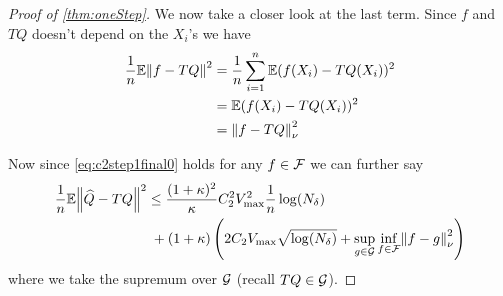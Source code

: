 \begin{proof}[Proof of \cref{thm:oneStep}]
  We now take a closer look at the last term. Since $f$ and $TQ$ doesn't
  depend on the $X_i$'s we have
  \begin{align*}
    \frac{1}{n} \mathbb{E} \norm{f- TQ}^2
    = & \; \frac{1}{n} \sum_{i=1}^n \mathbb{E} (f(X_i) - TQ(X_i))^2
    \\ = & \; \mathbb{E} (f(X_i) - TQ(X_i))^2
    \\ = & \; \norm{f - TQ}^2_\nu
  \end{align*}

  Now since \cref{eq:c2step1final0} holds
  for any $f \in \mathcal{F}$ we can further say
  \begin{align}
    \frac{1}{n} \mathbb{E} \norm{\widehat{Q} - TQ}^2
    & \leq \frac{(1+\kappa)^2}{\kappa} 
    C_2^2 V_{\max}^2 \frac{1}{n} \log(N_\delta)
    \notag
    \\ &\; + (1 + \kappa) \left(2 C_2 V_{\max} \sqrt{\log(N_\delta)}
      + \sup_{g \in \mathcal{G}} \inf_{f \in \mathcal{F}}
    \norm{f - g}^2_\nu \right)
    \label{eq:c2step1final}
  \end{align}
  where we take the supremum over $\mathcal{G}$ (recall $TQ \in \mathcal{G}$).


\end{proof}
